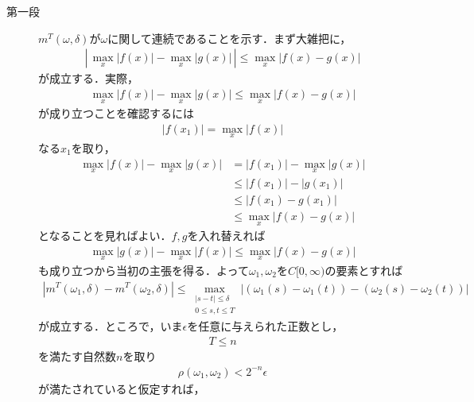 	\begin{sketch}\mbox{}
		\begin{description}
			\item[第一段]
				$m^T(\omega,\delta)$が$\omega$に関して連続であることを示す．まず大雑把に，
				\begin{align}
					\left|\, \operatorname*{max}_{x} |f(x)| - \operatorname*{max}_{x} |g(x)|\, \right|
					\leq \operatorname*{max}_{x} |f(x) - g(x)|
				\end{align}
				が成立する．実際，
				\begin{align}
					\operatorname*{max}_{x} |f(x)| - \operatorname*{max}_{x} |g(x)|
					\leq \operatorname*{max}_{x} |f(x) - g(x)|
				\end{align}
				が成り立つことを確認するには
				\begin{align}
					|f(x_1)| = \operatorname*{max}_{x} |f(x)|
				\end{align}
				なる$x_1$を取り，
				\begin{align}
					\operatorname*{max}_{x} |f(x)| - \operatorname*{max}_{x} |g(x)|
					&= |f(x_1)| - \operatorname*{max}_{x} |g(x)| \\
					&\leq |f(x_1)| - |g(x_1)| \\
					&\leq |f(x_1) - g(x_1)| \\
					&\leq \operatorname*{max}_{x} |f(x) - g(x)|
				\end{align}
				となることを見ればよい．$f,g$を入れ替えれば
				\begin{align}
					\operatorname*{max}_{x} |g(x)| - \operatorname*{max}_{x} |f(x)|
					\leq \operatorname*{max}_{x} |f(x) - g(x)|
				\end{align}
				も成り立つから当初の主張を得る．よって$\omega_1,\omega_2$を$C[0,\infty)$の要素とすれば
				\begin{align}
					\left| m^T(\omega_1,\delta) - m^T(\omega_2,\delta) \right|
					\leq \operatorname*{max}_{\substack{|s-t| \leq \delta \\ 0 \leq s,t \leq T}}
					|(\omega_1(s) - \omega_1(t)) - (\omega_2(s) - \omega_2(t))|
				\end{align}
				が成立する．ところで，いま$\epsilon$を任意に与えられた正数とし，
				\begin{align}
					T \leq n
				\end{align}
				を満たす自然数$n$を取り
				\begin{align}
					\rho(\omega_1,\omega_2) < 2^{-n} \epsilon
				\end{align}
				が満たされていると仮定すれば，

\end{description}
\end{sketch}
